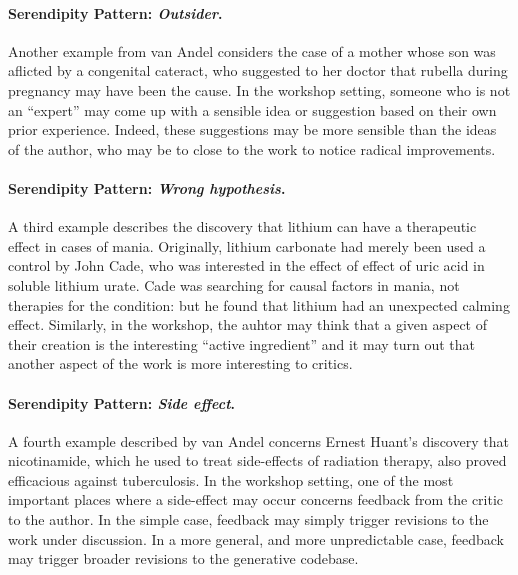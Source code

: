 \vspace{-2ex}
\paragraph{Serendipity Pattern: \emph{Outsider}.}  Another example from van Andel considers
the case of a mother whose son was aflicted by a congenital cateract,
who suggested to her doctor that rubella during pregnancy may have
been the cause.  In the workshop setting, someone who is not an
``expert'' may come up with a sensible idea or suggestion based on
their own prior experience.  Indeed, these suggestions may be more
sensible than the ideas of the author, who may be to close to the work
to notice radical improvements.  

\vspace{-2ex}
\paragraph{Serendipity Pattern: \emph{Wrong hypothesis}.}  A third example describes the discovery that lithium
can have a therapeutic effect in cases of mania.  Originally, lithium
carbonate had merely been used a control by John Cade, who was
interested in the effect of effect of uric acid in soluble lithium
urate.  Cade was searching for causal factors in mania, not therapies
for the condition: but he found that lithium had an unexpected calming
effect.  Similarly, in the workshop, the auhtor may think that a given
aspect of their creation is the interesting ``active ingredient'' and
it may turn out that another aspect of the work is more interesting to
critics.

\vspace{-2ex}
\paragraph{Serendipity Pattern: \emph{Side effect}.}  A fourth example described by van Andel concerns
Ernest Huant's discovery that nicotinamide, which he used to treat
side-effects of radiation therapy, also proved efficacious against
tuberculosis.  In the workshop setting, one of the most important
places where a side-effect may occur concerns feedback from the critic
to the author.  In the simple case, feedback may simply trigger
revisions to the work under discussion.  In a more general, and more
unpredictable case, feedback may trigger broader revisions to the
generative codebase.  

\medskip

